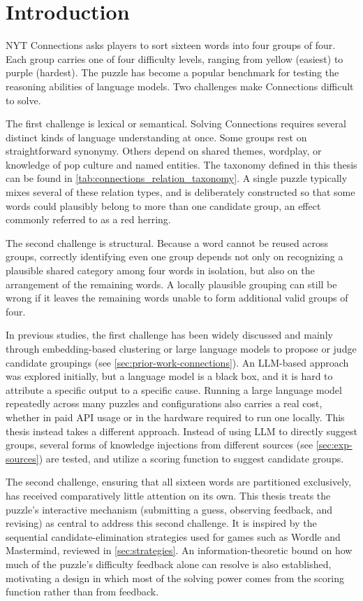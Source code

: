\chapter{Introduction}
\label{chap:introduction}

NYT Connections asks players to sort sixteen words into four groups of four. Each group carries one of four difficulty levels, ranging from yellow (easiest) to purple (hardest). The puzzle has become a popular benchmark for testing the reasoning abilities of language models. Two challenges make Connections difficult to solve.

The first challenge is lexical or semantical. Solving Connections requires several distinct kinds of language understanding at once. Some groups rest on straightforward synonymy. Others depend on shared themes, wordplay, or knowledge of pop culture and named entities. The taxonomy defined in this thesis can be found in \autoref{tab:connections_relation_taxonomy}. A single puzzle typically mixes several of these relation types, and is deliberately constructed so that some words could plausibly belong to more than one candidate group, an effect commonly referred to as a red herring.

The second challenge is structural. Because a word cannot be reused across groups, correctly identifying even one group depends not only on recognizing a plausible shared category among four words in isolation, but also on the arrangement of the remaining words. A locally plausible grouping can still be wrong if it leaves the remaining words unable to form additional valid groups of four.

In previous studies, the first challenge has been widely discussed and mainly through embedding-based clustering or large language models to propose or judge candidate groupings (see \autoref{sec:prior-work-connections}). An LLM-based approach was explored initially, but a language model is a black box, and it is hard to attribute a specific output to a specific cause. Running a large language model repeatedly across many puzzles and configurations also carries a real cost, whether in paid API usage or in the hardware required to run one locally. This thesis instead takes a different approach. Instead of using LLM to directly suggest groups, several forms of knowledge injections from different sources (see \autoref{sec:exp-sources}) are tested, and utilize a scoring function to suggest candidate groups.

The second challenge, ensuring that all sixteen words are partitioned exclusively, has received comparatively little attention on its own. This thesis treats the puzzle's interactive mechanism (submitting a guess, observing feedback, and revising) as central to address this second challenge. It is inspired by the sequential candidate-elimination strategies used for games such as Wordle and Mastermind, reviewed in \autoref{sec:strategies}. An information-theoretic bound on how much of the puzzle's difficulty feedback alone can resolve is also established, motivating a design in which most of the solving power comes from the scoring function rather than from feedback.

